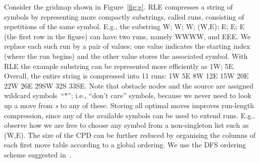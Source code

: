 \begin{example}\label{ex::first-move-table}
Consider the gridmap shown in Figure~\ref{fig:g}. RLE compresses a
string of symbols by representing more compactly substrings, called runs,
consisting of repetitions of the same symbol. E.g., the substring W; W; W;
(W,E); E; E; E (the first row in the figure) can have two runs, namely 
WWWW, and EEE. 
We replace each such run by a pair of values: one value indicates 
the starting index (where the run begins) and the other value stores the 
associated symbol. With RLE the example substring can be represented more 
efficiently as 1W; 5E.  
%
Overall, the entire string is compressed into 11 runs: 1W 5E 8W 12E 15W 20E 22W 26E
29SW 32S 33SE. Note that obstacle nodes and the source are assigned
{wildcard symbols}~``$*$''; i.e., ``don't care'' symbols,
because we never need to look up a move from \emph{s} to any of these.
%
Storing all optimal moves improves run-length 
compression, since any of the available symbols can be used
to extend runs.
E.g., observe how we are free
to choose any symbol from a non-singleton list such as (W,E). 
%
The size of the CPD can be further reduced by organising the columns
of each first move table according to a global ordering. We use the
DFS ordering scheme suggested in~\cite{strasser-et-al-2014}.
\end{example}

